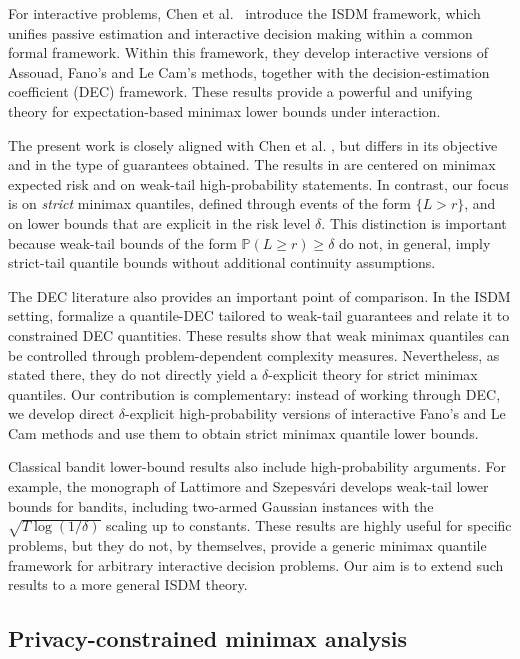 \documentclass[journal]{IEEEtran}
\begin{document}
For interactive problems, Chen et al.\ \cite{chen2024assouad} introduce the ISDM framework, which unifies passive estimation and interactive decision making within a common formal framework. Within this framework, they develop interactive versions of Assouad, Fano's and Le Cam's methods, together with the decision-estimation coefficient (DEC) framework. These results provide a powerful and unifying theory for expectation-based minimax lower bounds under interaction.

The present work is closely aligned with Chen et al. \cite{chen2024assouad}, but differs in its objective and in the type of guarantees obtained. The results in \cite{chen2024assouad} are centered on minimax expected risk and on weak-tail high-probability statements. In contrast, our focus is on \emph{strict} minimax quantiles, defined through events of the form \(\{L>r\}\), and on lower bounds that are explicit in the risk level \(\delta\). This distinction is important because weak-tail bounds of the form \(\mathbb{P}(L\ge r)\ge \delta\) do not, in general, imply strict-tail quantile bounds without additional continuity assumptions.

The DEC literature also provides an important point of comparison. In the ISDM setting, \cite{chen2024assouad} formalize a quantile-DEC tailored to weak-tail guarantees and relate it to constrained DEC quantities. These results show that weak minimax quantiles can be controlled through problem-dependent complexity measures. Nevertheless, as stated there, they do not directly yield a \(\delta\)-explicit theory for strict minimax quantiles. Our contribution is complementary: instead of working through DEC, we develop direct \(\delta\)-explicit high-probability versions of interactive Fano's and Le Cam methods and use them to obtain strict minimax quantile lower bounds.

Classical bandit lower-bound results also include high-probability arguments. For example, the monograph of Lattimore and Szepesv\'ari \cite{lattimore2020bandit} develops weak-tail lower bounds for bandits, including two-armed Gaussian instances with the \(\sqrt{T\log(1/\delta)}\) scaling up to constants. These results are highly useful for specific problems, but they do not, by themselves, provide a generic minimax quantile framework for arbitrary interactive decision problems. Our aim is to extend such results to a more general ISDM theory.

\subsection{Privacy-constrained minimax analysis}
\end{document}
